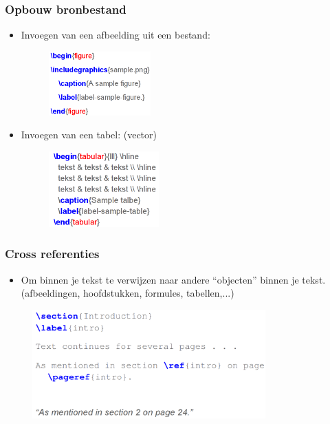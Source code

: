\documentclass{beamer}
\begin{document}
\begin{frame}
\frametitle{Opbouw bronbestand}
\begin{itemize}[<+->]
 \item Invoegen van een afbeelding uit een bestand:
 \begin{figure}[h] 
  \includegraphics[width=0.37\textwidth]{images/figure.png}
\end{figure}
 \item Invoegen van een tabel: (vector)
  \begin{figure}[h] 
  \includegraphics[width=0.4\textwidth]{images/tabel.png}
\end{figure}
\end{itemize}
\end{frame}


\begin{frame}
\frametitle{Cross referenties}
\begin{itemize}[<+->]
 \item Om binnen je tekst te verwijzen naar andere ``objecten'' binnen je tekst. (afbeeldingen, hoofdstukken, formules, tabellen,...)
\end{itemize}
  \begin{figure}[h] 
    \includegraphics[width=0.8\textwidth]{images/reference.png}
  \end{figure}
\end{frame}
\end{document}
